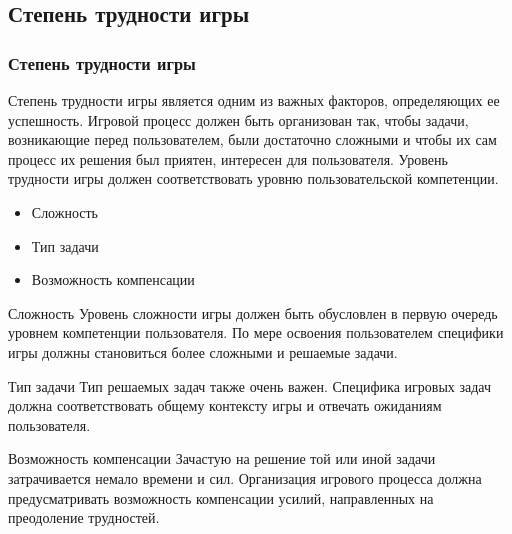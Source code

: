 \documentclass[10pt]{beamer}
\begin{document}
\subsection{Степень трудности игры}
\begin{frame}
\frametitle{Степень трудности игры}

\begin{block}{}
  Степень трудности игры является одним из важных факторов, определяющих ее успешность. Игровой процесс должен быть организован так, чтобы задачи, возникающие перед пользователем, были достаточно сложными и чтобы их сам процесс их решения был приятен, интересен для пользователя. Уровень трудности игры должен соответствовать уровню пользовательской компетенции.
  \begin{itemize}
    \item Сложность
    \item Тип задачи
    \item Возможность компенсации
  \end{itemize}
\end{block}

\end{frame}

\begin{frame}

\begin{block}{Сложность}
  Уровень сложности игры должен быть обусловлен в первую очередь уровнем компетенции пользователя. По мере освоения пользователем специфики игры должны становиться более сложными и решаемые задачи.
\end{block}

\begin{block}{Тип задачи}
  Тип решаемых задач также очень важен. Специфика игровых задач должна соответствовать общему контексту игры и отвечать ожиданиям пользователя.
\end{block}

\begin{block}{Возможность компенсации}
  Зачастую на решение той или иной задачи затрачивается немало времени и сил. Организация игрового процесса должна предусматривать возможность компенсации усилий, направленных на преодоление трудностей.
\end{block}

\end{frame}
\end{document}
